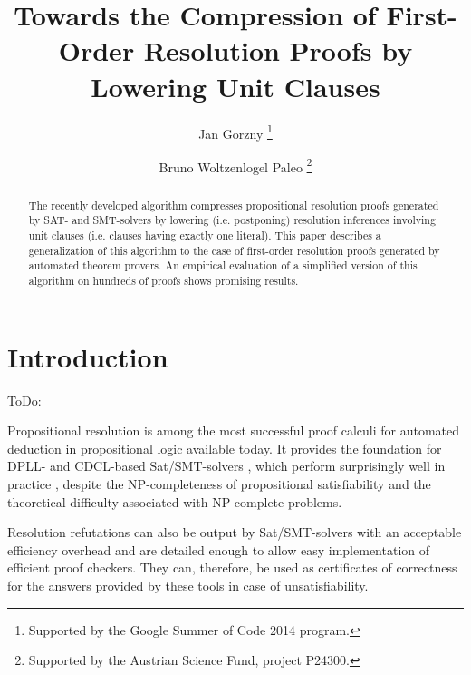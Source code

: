 \documentclass{llncs}
\title{Towards the Compression of First-Order Resolution Proofs by Lowering Unit Clauses}
\author{
  Jan Gorzny\inst{1}
  \thanks{Supported by the Google Summer of Code 2014 program.}
  \and 
  Bruno Woltzenlogel Paleo\inst{2}
  \thanks{Supported by the Austrian Science Fund, project P24300.}
}
\institute{
  University of Victoria, Canada \\
  \email{joseph.boudou@matabio.net}
  \and 
  Vienna University of Technology, Austria \\
  \email{bruno@logic.at}
}
\begin{document}
\maketitle


\begin{abstract}
The recently developed {\LowerUnits} algorithm compresses
propositional resolution proofs generated by SAT- and SMT-solvers by lowering (i.e. postponing) resolution inferences involving unit clauses (i.e. clauses having exactly one literal). This paper describes a generalization of this algorithm to the case of first-order resolution proofs generated by automated theorem provers. An empirical evaluation of a simplified version of this algorithm on hundreds of proofs shows promising results.
\end{abstract}


\setcounter{footnote}{0}

\section{Introduction}

ToDo:

Propositional resolution is among the most successful proof calculi for automated deduction in propositional logic available today. It provides the foundation for DPLL- and CDCL-based Sat/SMT-solvers \cite{veriT}, which perform surprisingly well in practice \cite{sat-competition}, despite the NP-completeness of propositional satisfiability \cite{cook} and the theoretical difficulty associated with NP-complete problems. 

Resolution refutations can also be output by Sat/SMT-solvers with an acceptable efficiency overhead and are detailed enough to allow easy implementation of efficient proof checkers. They can, therefore, be used as certificates of correctness for the answers provided by these tools in case of unsatisfiability.
\end{document}
